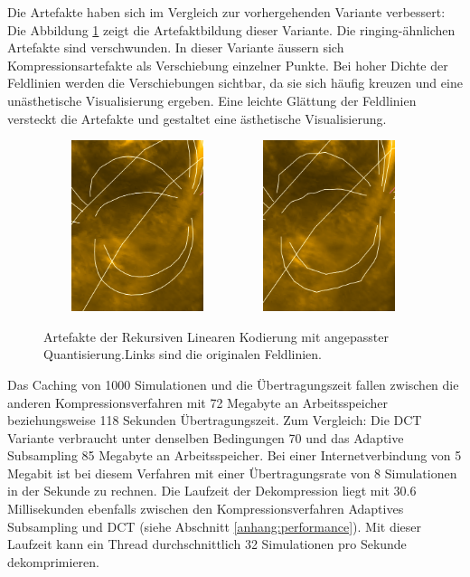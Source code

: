 Die Artefakte haben sich im Vergleich zur vorhergehenden Variante verbessert: Die Abbildung \ref{resultate:loesung2:adaptive:median_extra:artefakte} zeigt die Artefaktbildung dieser Variante. Die ringing-ähnlichen Artefakte sind verschwunden. In dieser Variante äussern sich Kompressionsartefakte als Verschiebung einzelner Punkte. Bei hoher Dichte der Feldlinien werden die Verschiebungen sichtbar, da sie sich häufig kreuzen und eine unästhetische Visualisierung ergeben. Eine leichte Glättung der Feldlinien versteckt die Artefakte und gestaltet eine ästhetische Visualisierung.

\begin{figure}[!htbp]
	\center
		\includegraphics[width=0.49\textwidth,height=5cm,keepaspectratio]{./pictures/resultate/loesung2/variante3/no_artifacts.png}
	\includegraphics[width=0.49\textwidth,height=5cm,keepaspectratio]{./pictures/resultate/loesung2/variante3/artifacts_extra.png}
	\caption{Artefakte der Rekursiven Linearen Kodierung mit angepasster Quantisierung.Links sind die originalen Feldlinien.}
	\label{resultate:loesung2:adaptive:median_extra:artefakte}
\end{figure}

Das Caching von 1000 Simulationen und die Übertragungszeit fallen zwischen die anderen Kompressionsverfahren mit 72 Megabyte an Arbeitsspeicher beziehungsweise 118 Sekunden Übertragungszeit. Zum Vergleich: Die DCT Variante verbraucht unter denselben Bedingungen 70 und das Adaptive Subsampling 85 Megabyte an Arbeitsspeicher. Bei einer Internetverbindung von 5 Megabit ist bei diesem Verfahren mit einer Übertragungsrate von 8 Simulationen in der Sekunde zu rechnen. Die Laufzeit der Dekompression liegt mit 30.6 Millisekunden ebenfalls zwischen den Kompressionsverfahren Adaptives Subsampling und DCT (siehe Abschnitt \ref{anhang:performance}). Mit dieser Laufzeit kann ein Thread durchschnittlich 32 Simulationen pro Sekunde dekomprimieren.